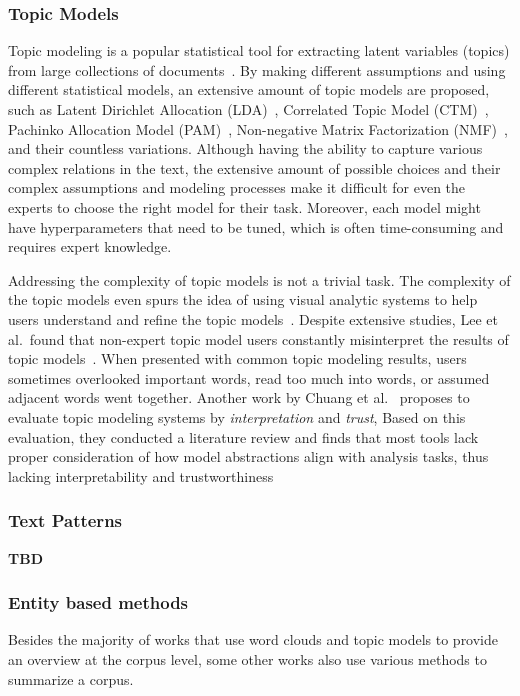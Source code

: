 \subsubsection{Topic Models}
Topic modeling is a popular statistical tool for extracting latent variables (topics) from large collections of documents~\cite{vayansky2020topicreview}.
By making different assumptions and using different statistical models, an extensive amount of topic models are proposed,
such as Latent Dirichlet Allocation (LDA)~\cite{blei2003LDA}, Correlated Topic Model (CTM)~\cite{blei2006correlated}, Pachinko Allocation Model (PAM)~\cite{li2006pachinko}, Non-negative Matrix Factorization (NMF)~\cite{lee1999NMF},
and their countless variations.
Although having the ability to capture various complex relations in the text, the extensive amount of possible choices and their complex assumptions and modeling processes make it difficult for even the experts to choose the right model for their task.
Moreover, each model might have hyperparameters that need to be tuned, which is often time-consuming and requires expert knowledge.

Addressing the complexity of topic models is not a trivial task.
The complexity of the topic models even spurs the idea of using visual analytic systems to help users understand and refine the topic models~\cite{el2017progressive, choo2013utopian, lee2012ivisclustering, kim2016topiclens, chaney2012visualizing, gretarsson2012topicnets}.
Despite extensive studies, Lee et al.\ found that non-expert topic model users constantly misinterpret the results of topic models~\cite{lee2017human}. 
When presented with common topic modeling results, users sometimes overlooked important words, read too much into words, or assumed adjacent words went together.
Another work by Chuang et al.~\cite{chuang2012interpretation} proposes to evaluate topic modeling systems by \textit{interpretation} and \textit{trust},
Based on this evaluation, they conducted a literature review and finds that most tools lack proper consideration of how model abstractions align with analysis tasks, thus lacking interpretability and trustworthiness

\subsubsection{Text Patterns}
\textbf{TBD}
\subsubsection{Entity based methods}
Besides the majority of works that use word clouds and topic models to provide an overview at the corpus level,
some other works also use various methods to summarize a corpus.

